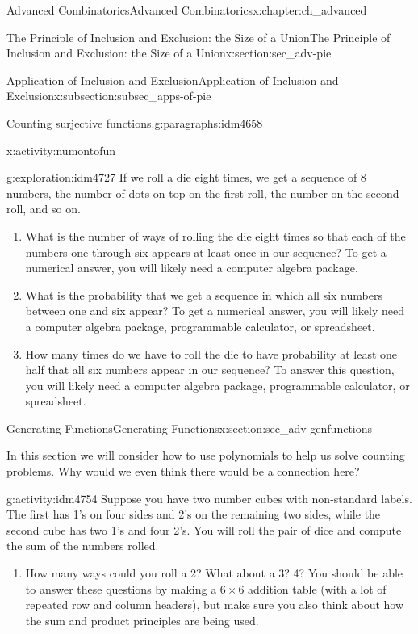 \documentclass[oneside,10pt,]{book}
\numberwithin{equation}{chapter}
\begin{document}
\begin{chapterptx}{Advanced Combinatorics}{}{Advanced Combinatorics}{}{}{x:chapter:ch_advanced}
\begin{sectionptx}{The Principle of Inclusion and Exclusion: the Size of a Union}{}{The Principle of Inclusion and Exclusion: the Size of a Union}{}{}{x:section:sec_adv-pie}
\begin{subsectionptx}{Application of Inclusion and Exclusion}{}{Application of Inclusion and Exclusion}{}{}{x:subsection:subsec_apps-of-pie}
\begin{paragraphs}{Counting surjective functions.}{g:paragraphs:idm4658}
\begin{activity}{}{x:activity:numontofun}
\end{activity}
\begin{exploration}{}{g:exploration:idm4727}%
If we roll a die eight times, we get a sequence of 8 numbers, the number of dots on top on the first roll, the number on the second roll, and so on.%
\begin{enumerate}[font=\bfseries,label=(\alph*),ref=\alph*]
\item{}What is the number of ways of rolling the die eight times so that each of the numbers one through six appears at least once in our sequence? To get a numerical answer, you will likely need a computer algebra package.%
\item{}What is the probability that we get a sequence in which all six numbers between one and six appear? To get a numerical answer, you will likely need a computer algebra package, programmable calculator, or spreadsheet.%
\item{}How many times do we have to roll the die to have probability at least one half that all six numbers appear in our sequence? To answer this question, you will likely need a computer algebra package, programmable calculator, or spreadsheet.%
\end{enumerate}
\end{exploration}
\end{paragraphs}%
\end{subsectionptx}
\end{sectionptx}
%
%
\typeout{************************************************}
\typeout{************************************************}
%
\begin{sectionptx}{Generating Functions}{}{Generating Functions}{}{}{x:section:sec_adv-genfunctions}
\begin{introduction}{}%
In this section we will consider how to use polynomials to help us solve counting problems.  Why would we even think there would be a connection here?%
\begin{activity}{}{g:activity:idm4754}%
Suppose you have two number cubes with non-standard labels.  The first has 1's on four sides and 2's on the remaining two sides, while the second cube has two 1's and four 2's. You will roll the pair of dice and compute the sum of the numbers rolled.%
\begin{enumerate}[font=\bfseries,label=(\alph*),ref=\alph*]
\item{}How many ways could you roll a 2?  What about a 3?  4?  You should be able to answer these questions by making a \(6\times 6\) addition table (with a lot of repeated row and column headers), but make sure you also think about how the sum and product principles are being used.%

\end{enumerate}
\end{activity}
\end{introduction}
\end{sectionptx}
\end{chapterptx}
\end{document}
